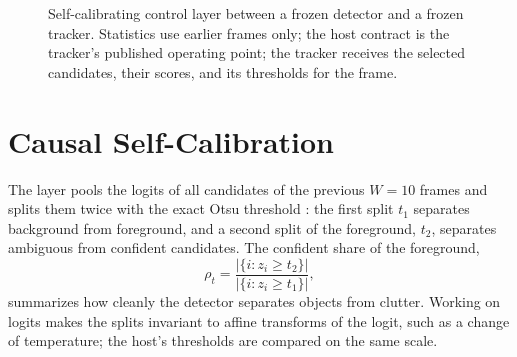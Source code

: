 \begin{figure}[tbp]
\centering
{}
\caption{Self-calibrating control layer between a frozen detector and a frozen tracker. Statistics use earlier frames only; the host contract is the tracker's published operating point; the tracker receives the selected candidates, their scores, and its thresholds for the frame.}
\label{fig:ch5-arch}
\end{figure}

\section{Causal Self-Calibration}\label{sec:ch5-calib}
The layer pools the logits of all candidates of the previous $W=10$ frames and splits them twice with the exact Otsu threshold \cite{otsu1979}: the first split $t_1$ separates background from foreground, and a second split of the foreground, $t_2$, separates ambiguous from confident candidates. The confident share of the foreground,
\begin{equation}
\rho_t = \frac{\left|\{i: z_i \ge t_2\}\right|}{\left|\{i: z_i \ge t_1\}\right|},
\label{eq:ch5-rho}
\end{equation}
summarizes how cleanly the detector separates objects from clutter. Working on logits makes the splits invariant to affine transforms of the logit, such as a change of temperature; the host's thresholds are compared on the same scale.

